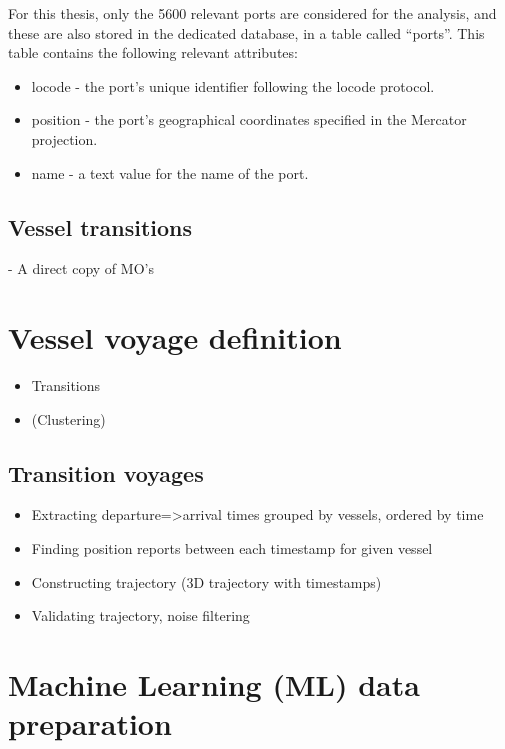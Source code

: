 For this thesis, only the 5600 relevant ports are considered for the analysis, and these are also stored in the dedicated database, in a table called ``ports''. This table contains the following relevant attributes:

\begin{itemize}
    \item locode - the port's unique identifier following the \gls{locode} protocol.
    \item position - the port's geographical coordinates specified in the Mercator projection.
    \item name - a text value for the name of the port.
\end{itemize}

\subsection{Vessel transitions}

 - A direct copy of MO's

\section{Vessel voyage definition}

\begin{itemize}
    \item Transitions
    \item (Clustering)
\end{itemize}


\subsection{Transition voyages}

\begin{itemize}
    \item Extracting departure=>arrival times grouped by vessels, ordered by time
    \item Finding position reports between each timestamp for given vessel
    \item Constructing trajectory (3D trajectory with timestamps)
    \item Validating trajectory, noise filtering
\end{itemize}

\section{Machine Learning (ML) data preparation}

